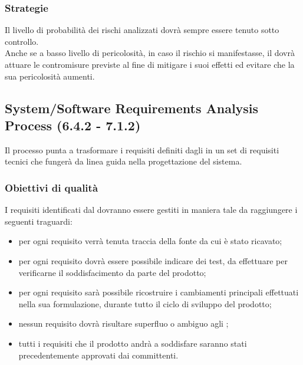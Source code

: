 \subsubsection{Strategie}
Il livello di probabilità dei rischi analizzati dovrà sempre essere tenuto sotto controllo.\\
Anche se a basso livello di pericolosità, in caso il rischio si manifestasse, il  dovrà attuare le contromisure previste al fine di mitigare i suoi effetti ed evitare che la sua pericolosità aumenti.
\subsection{System/Software Requirements Analysis Process (6.4.2 - 7.1.2)}
\label{sySoRequiAna}
Il processo punta a trasformare i requisiti definiti dagli  in un set di requisiti tecnici che fungerà da linea guida nella progettazione del sistema.
\subsubsection{Obiettivi di qualità}
I requisiti identificati dal  dovranno essere gestiti in maniera tale da raggiungere i seguenti traguardi:
\begin{itemize}
\item per ogni requisito verrà tenuta traccia della fonte da cui è stato ricavato;
\item per ogni requisito dovrà essere possibile indicare dei test, da effettuare per verificarne il soddisfacimento da parte del prodotto;
\item per ogni requisito sarà possibile ricostruire i cambiamenti principali effettuati nella sua formulazione, durante tutto il ciclo di sviluppo del prodotto;
\item nessun requisito dovrà risultare superfluo o ambiguo agli ;
\item tutti i requisiti che il prodotto andrà a soddisfare saranno stati precedentemente approvati dai committenti.
\end{itemize}
